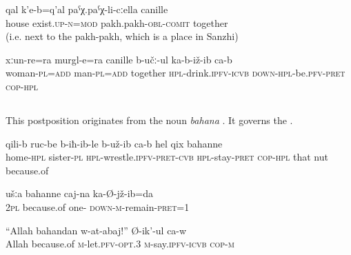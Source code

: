 \begin{exe}
	\ex	\label{ex:There is a house together with the pakh-pakh}
	\gll	qal	k'e-b=q'al	paˁχ.paˁχ-li-cːella	canille  \\
		house	exist.\textsc{up}-\textsc{n}=\textsc{mod}	pakh.pakh-\textsc{obl}-\textsc{comit}	together\\
	\glt	{} (i.e. next to the pakh-pakh, which is a place in Sanzhi)

	\ex	\label{ex:Men and women are sitting together and drinking}
	\gll	xːun-re=ra	murgl-e=ra	canille	b-učː-ul	ka-b-iž-ib	ca-b  \\
		woman-\textsc{pl}=\textsc{add}	man-\textsc{pl}=\textsc{add}	together	\textsc{hpl}-drink.\textsc{ipfv}-\textsc{icvb}	\textsc{down-hpl}-be.\textsc{pfv}-\textsc{pret}	\textsc{cop-hpl}\\
	\glt	{}
\end{exe}



\subsection{ }
\label{ssec:postposition bahanne}

This postposition originates from the noun \textit{bahana} . It governs the .

\begin{exe}
	\ex
	\begin{xlist}
		\ex	\label{At home the sisters were apparently arguing because of the nut}
		\gll	qili-b	ruc-be	b-iħ-ib-le	b-už-ib ca-b	hel	qix	bahanne  \\
			home-\textsc{hpl}	sister-\textsc{pl}	\textsc{hpl}-wrestle.\textsc{ipfv}-\textsc{pret}-\textsc{cvb}	\textsc{hpl}-stay-\textsc{pret} \textsc{cop-hpl}	that	nut	because.of\\
		\glt	{}

		\ex	\label{Because of you I sat in prison once}
		\gll	ušːa	bahanne	caj-na	ka-Ø-jž-ib=da  \\
			2\textsc{pl}	because.of	one-	\textsc{down-m}-remain-\textsc{pret}=1\\
		\glt	{}

		\ex	\label{For God’s sake, let me, he says}
		\gll	``Allah	bahandan	w-at-abaj!''	Ø-ik'-ul	ca-w  \\
			Allah	because.of	\textsc{m}-let.\textsc{pfv}-\textsc{opt}.3	\textsc{m}-say.\textsc{ipfv}-\textsc{icvb}	\textsc{cop-m}\\
		\glt	{}
	\end{xlist}
\end{exe}


